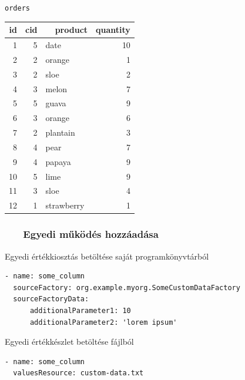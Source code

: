 \documentclass[
]{beamer}
\newcommand{\slidetitle}[2]{\frametitle{{\small #1 ~ \ding{226} ~ } \normalsize \textbf{#2} }}
\begin{document}
\begin{frame}[fragile]
\begin{minipage}[c]{0.45\textwidth}
        \normalsize \texttt{orders}
        \vspace{0.1cm}
        
        \tiny
        \begin{tabular}{ |r|r|l|r| }
        \hline
            id & cid & ~~product & quantity \\
        \hline
            1 & 5 & date & 10 \\
            2 & 2 & orange & 1 \\
            3 & 2 & sloe & 2 \\
            4 & 3 & melon & 7 \\
            5 & 5 & guava & 9 \\
            6 & 3 & orange & 6 \\
            7 & 2 & plantain & 3 \\
            8 & 4 & pear & 7 \\
            9 & 4 & papaya & 9 \\
            10 & 5 & lime & 9 \\
            11 & 3 & sloe & 4 \\
            12 & 1 & strawberry & 1 \\
        \hline
        \end{tabular}
    \end{minipage}
\end{frame}

\begin{frame}[containsverbatim]
    \slidetitle{\sectionshorttitle}{Egyedi működés hozzáadása}
    
    {\color{beamer@blendedblue}Egyedi értékkiosztás betöltése saját programkönyvtárból}
    
    \vspace{0.5em}
    
    \begin{verbatim}
- name: some_column
  sourceFactory: org.example.myorg.SomeCustomDataFactory
  sourceFactoryData:
      additionalParameter1: 10
      additionalParameter2: 'lorem ipsum'
    \end{verbatim}
    
    \vspace{1em}
    
    {\color{beamer@blendedblue}Egyedi értékkészlet betöltése fájlból}
    
    \vspace{0.5em}
    
    \begin{verbatim}
- name: some_column
  valuesResource: custom-data.txt
    \end{verbatim}
    
\end{frame}
\end{document}
